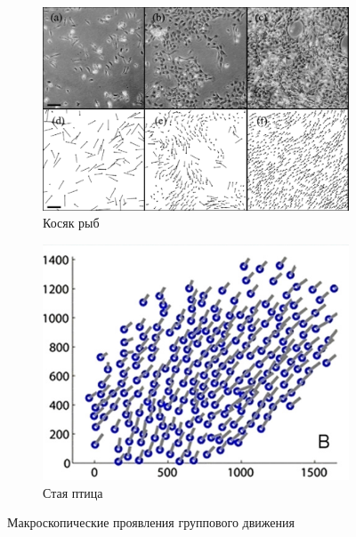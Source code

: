     \begin{figure}
    	\centering
        \begin{subfigure}{0.4\textwidth}
                \includegraphics[width=\textwidth]{Images/Fig17_CollectiveMotion}
                \caption{Косяк рыб}
                \label{fig:CollMot:fishes}
        \end{subfigure}
        \begin{subfigure}{0.4\textwidth}
                \includegraphics[width=\textwidth]{Images/Fig29_CollectiveMotion_part}
                \caption{Стая птица}
                \label{fig:CollMot:ducks}
        \end{subfigure}
        \caption{Макроскопические проявления группового движения}\label{fig:CollMot:macroscopic}
	\end{figure}

